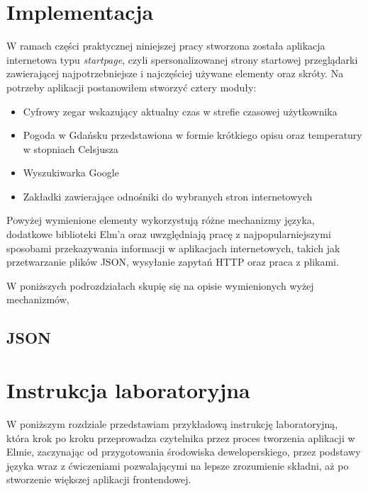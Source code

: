 \documentclass[twoside,a4paper]{report}
\begin{document}

\chapter{Implementacja}
W ramach części praktycznej niniejszej pracy stworzona została aplikacja internetowa typu \textit{startpage}, czyli spersonalizowanej strony startowej przeglądarki zawierającej najpotrzebniejsze i najczęściej używane elementy oraz skróty.
Na potrzeby aplikacji postanowiłem stworzyć cztery moduły:
\begin{itemize}[noitemsep,topsep=0pt]
    \item Cyfrowy zegar wskazujący aktualny czas w strefie czasowej użytkownika
    \item Pogoda w Gdańsku przedstawiona w formie krótkiego opisu oraz temperatury w stopniach Celsjusza
    \item Wyszukiwarka Google
    \item Zakładki zawierające odnośniki do wybranych stron internetowych
\end{itemize}

Powyżej wymienione elementy wykorzystują różne mechanizmy języka, dodatkowe biblioteki Elm'a oraz uwzględniają pracę z najpopularniejszymi sposobami przekazywania informacji w aplikacjach internetowych, takich jak przetwarzanie plików JSON, wysyłanie zapytań HTTP oraz praca z plikami.

W poniższych podrozdziałach skupię się na opisie wymienionych wyżej mechanizmów,

\section{JSON}


\chapter{Instrukcja laboratoryjna}
W poniższym rozdziale przedstawiam przykładową instrukcję laboratoryjną, która krok po kroku przeprowadza czytelnika przez proces tworzenia aplikacji w Elmie, zaczynając od przygotowania środowiska deweloperskiego, przez podstawy języka wraz z ćwiczeniami pozwalającymi na lepsze zrozumienie składni, aż po stworzenie większej aplikacji frontendowej.
\end{document}
